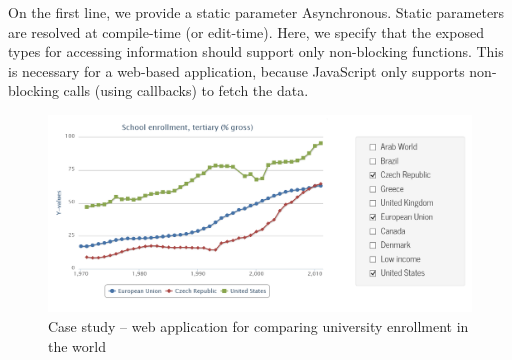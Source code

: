 \documentclass[submission,copyright,creativecommons]{eptcs}
\newcommand{\ident}[1]{\textnormal{\sffamily #1}}
\begin{document}
On the first line, we provide a static parameter \ident{Asynchronous}. Static parameters are 
resolved at compile-time (or edit-time). Here, we specify that the exposed types for accessing 
information should support only non-blocking functions. This is necessary for a web-based 
application, because JavaScript only supports non-blocking calls (using callbacks) to fetch the data. 


\begin{figure}[!t]
\hspace{3em} \includegraphics[width=35em]{worldbank.png}
\caption{Case study -- web application for comparing university enrollment in the world}
\label{fig:wb}
\end{figure}

\end{document}
